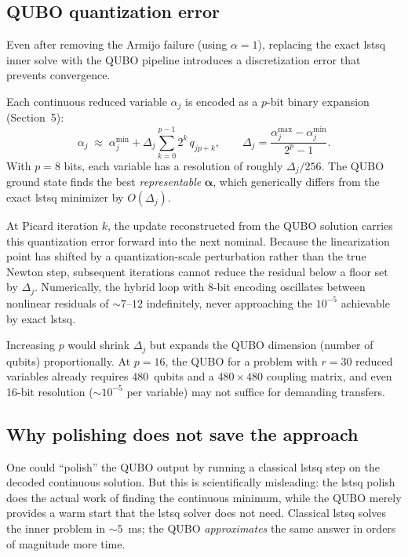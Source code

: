 \documentclass[8pt,a4paper]{article}
\theoremstyle{definition}
\theoremstyle{remark}
\begin{document}
\subsection{QUBO quantization error}\label{sec:qubo-quantization}

Even after removing the Armijo failure (using $\alpha=1$), replacing
the exact lstsq inner solve with the QUBO pipeline introduces a
discretization error that prevents convergence.

Each continuous reduced variable $\alpha_j$ is encoded as a
$p$-bit binary expansion (Section~5):
\[
  \alpha_j \;\approx\; \alpha_j^{\min} + \Delta_j \sum_{k=0}^{p-1}
  2^k\, q_{jp+k},
  \qquad
  \Delta_j = \frac{\alpha_j^{\max} - \alpha_j^{\min}}{2^p - 1}.
\]
With $p=8$ bits, each variable has a resolution of roughly
$\Delta_j / 256$.  The QUBO ground state finds the best
\emph{representable} $\bm\alpha$, which generically differs from the
exact lstsq minimizer by $O(\Delta_j)$.

At Picard iteration $k$, the update reconstructed from the QUBO
solution carries this quantization error forward into the next
nominal.  Because the linearization point has shifted by a
quantization-scale perturbation rather than the true Newton step,
subsequent iterations cannot reduce the residual below a floor set by
$\Delta_j$.  Numerically, the hybrid loop with 8-bit encoding
oscillates between nonlinear residuals of $\sim 7$--$12$ indefinitely,
never approaching the $10^{-5}$ achievable by exact lstsq.

Increasing $p$ would shrink $\Delta_j$ but expands the QUBO dimension
(number of qubits) proportionally.  At $p=16$, the QUBO for a problem
with $r = 30$ reduced variables already requires $480$~qubits and a
$480 \times 480$ coupling matrix, and even 16-bit resolution
($\sim 10^{-5}$ per variable) may not suffice for demanding transfers.

\subsection{Why polishing does not save the approach}

One could ``polish'' the QUBO output by running a classical lstsq step
on the decoded continuous solution.  But this is scientifically
misleading: the lstsq polish does the actual work of finding the
continuous minimum, while the QUBO merely provides a warm start that
the lstsq solver does not need.  Classical lstsq solves the inner
problem in $\sim 5$~ms; the QUBO \emph{approximates} the same answer
in orders of magnitude more time.
\end{document}
